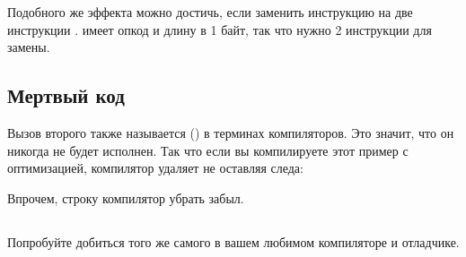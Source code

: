 Подобного же эффекта можно достичь, если заменить инструкцию \JMP на две инструкции \NOP.
\NOP имеет опкод  и длину в 1 байт, так что нужно 2 инструкции для замены.

\subsection{Мертвый код}

Вызов второго \printf также называется  () 
в терминах компиляторов.
Это значит, что он никогда не будет исполнен.
Так что если вы компилируете этот пример с оптимизацией, компилятор удаляет  не оставляя следа:



Впрочем, строку  компилятор убрать забыл.


\subsection{\Exercise}

Попробуйте добиться того же самого в вашем любимом компиляторе и отладчике.

